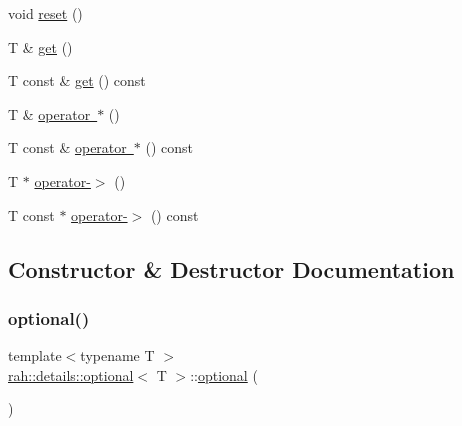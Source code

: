 \begin{DoxyCompactItemize}
\item 
void \mbox{\hyperlink{structrah_1_1details_1_1optional_ab0d982081783ade3caa9eb1150d9936b}{reset}} ()
\item 
T \& \mbox{\hyperlink{structrah_1_1details_1_1optional_a2081a4739c508aceb5633ead8bd57786}{get}} ()
\item 
T const  \& \mbox{\hyperlink{structrah_1_1details_1_1optional_a7b395097e061b76c604da09fe44ee043}{get}} () const
\item 
T \& \mbox{\hyperlink{structrah_1_1details_1_1optional_a323ce53e8877c68ecf4f3d19bb902efa}{operator $\ast$}} ()
\item 
T const  \& \mbox{\hyperlink{structrah_1_1details_1_1optional_ab479ebfb4ea17aec5147b7aa897ad1d6}{operator $\ast$}} () const
\item 
T $\ast$ \mbox{\hyperlink{structrah_1_1details_1_1optional_a5e7c15a3b0cfff00d1f45397b5e27319}{operator-\/$>$}} ()
\item 
T const  $\ast$ \mbox{\hyperlink{structrah_1_1details_1_1optional_a53abf817f8c1c23e3235bdde3eeded32}{operator-\/$>$}} () const
\end{DoxyCompactItemize}


\subsection{Constructor \& Destructor Documentation}
\mbox{\label{structrah_1_1details_1_1optional_a6804687765e89a112e42257aa322b66a}} 
\subsubsection{\texorpdfstring{optional()}{optional()}\hspace{0.1cm}{\footnotesize\ttfamily [1/3]}}
{\footnotesize\ttfamily template$<$typename T $>$ \\
\mbox{\hyperlink{structrah_1_1details_1_1optional}{rah\+::details\+::optional}}$<$ T $>$\+::\mbox{\hyperlink{structrah_1_1details_1_1optional}{optional}} (\begin{DoxyParamCaption}{ }\end{DoxyParamCaption})\hspace{0.3cm}{\ttfamily [default]}}

\mbox{\label{structrah_1_1details_1_1optional_a95c8f29ac31c32ff4c91c1931aa36e3b}} 
